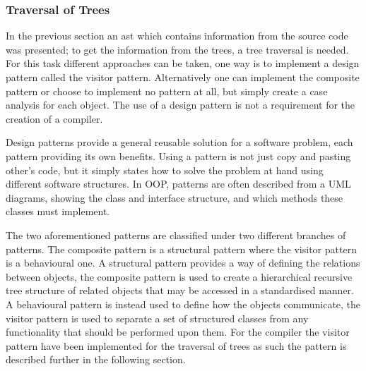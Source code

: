 \subsubsection*{Traversal of Trees}
In the previous section an \acrshort{ast} which contains information from the source code was presented; to get the information from the trees, a tree traversal is needed.
For this task different approaches can be taken, one way is to implement a design pattern called the visitor pattern.
Alternatively one can implement the composite pattern or choose to implement no pattern at all, but simply create a case analysis for each object.
The use of a design pattern is not a requirement for the creation of a compiler.

Design patterns provide a general reusable solution for a software problem, each pattern providing its own benefits.
Using a pattern is not just copy and pasting other's code, but it simply states how to solve the problem at hand using different software structures.
In OOP, patterns are often described from a UML diagrams, showing the class and interface structure, and which methods these classes must implement. 

The two aforementioned patterns are classified under two different branches of patterns.
The composite pattern is a structural pattern where the visitor pattern is a behavioural one.
A structural pattern provides a way of defining the relations between objects, the composite pattern is used to create a hierarchical recursive tree structure of related objects that may be accessed in a standardised manner.
A behavioural pattern is instead used to define how the objects communicate, the visitor pattern is used to separate a set of structured classes from any functionality that should be performed upon them.\citep{GOF}
For the compiler the visitor pattern have been implemented for the traversal of trees as such the pattern is described further in the following section. 

